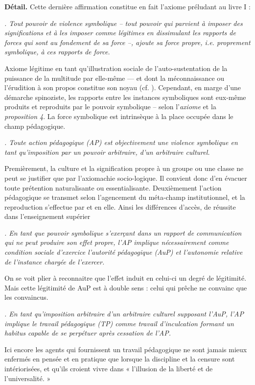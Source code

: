 \documentclass[11pt]{amsart}
\begin{document}
\textbf{Détail.} Cette dernière affirmation constitue en fait l'axiome préludant au livre I : 

\textsl{. Tout pouvoir de violence symbolique – tout pouvoir qui parvient à imposer des significations et à les imposer comme légitimes en dissimulant les rapports de forces qui sont au fondement de sa force –, ajoute sa force propre, \emph{i.e.} proprement symbolique, à ces rapports de force.}

Axiome légitime en tant qu'illustration sociale de l'auto-sustentation de la puissance de la multitude par elle-même — et dont la méconnaissance ou l'érudition à son propos constitue son noyau (cf. ). Cependant, en marge d'une démarche spinoziste, les rapports entre les instances symboliques sont eux-même produits et reproduits par le pouvoir symbolique – selon l'\textsl{axiome} et la \textsl{proposition 4}. La force symbolique est intrinsèque à la place occupée dans le champ pédagogique.

\textsl{. Toute \emph{action pédagogique (AP)} est objectivement une violence symbolique en tant qu'imposition par un pouvoir arbitraire, d'un arbitraire culturel.}

Premièrement, la culture et la signification propre à un groupe ou une classe ne peut se justifier que par l'axiomachie socio-logique. Il convient donc d'en évacuer toute prétention naturalisante ou essentialisante. Deuxièmement l'action pédagogique se transmet selon l'agencement du méta-champ institutionnel, et la reproduction s'effectue par et en elle. Ainsi les différences d'accès, de réussite dans l'enseignement supérier 

\textsl{. En tant que pouvoir symbolique s'exerçant dans un rapport de communication qui ne peut produire son effet propre, l'AP implique nécessairement comme condition sociale d'exercice l'\emph{autorité pédagogique (AuP)} et l'\emph{autonomie relative} de l'instance chargée de l'exercer.}

On se voit plier à reconnaitre que l'effet induit en celui-ci un degré de légitimité. Mais cette légitimité de AuP est à double sens : celui qui prêche ne convainc que les convaincus.

\textsl{. En tant qu'imposition arbitraire d'un arbitraire culturel supposant l'AuP, l'AP implique le \emph{travail pédagogique (TP)} comme travail d'inculcation formant un habitus capable de se perpétuer après cessation de l'AP.}

Ici encore les agents qui fournissent un travail pédagogique ne sont jamais mieux enfermés en pensée et en pratique que lorsque la discipline et la censure sont intériorisées, et qu'ils croient vivre dans « l'illusion de la liberté et de l'universalité. »
\end{document}
